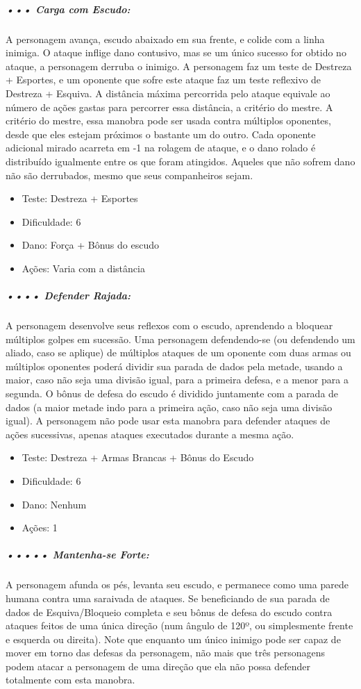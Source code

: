 \subparagraph{\bf ••• Carga com Escudo:}
A personagem avança, escudo abaixado em sua frente, e colide com a linha inimiga. O ataque inflige dano contusivo, mas se um único sucesso for obtido no ataque, a personagem derruba o inimigo. A personagem faz um teste de Destreza + Esportes, e um oponente que sofre este ataque faz um teste reflexivo de Destreza + Esquiva. A distância máxima percorrida pelo ataque equivale ao número de ações gastas para percorrer essa distância, a critério do mestre. A critério do mestre, essa manobra pode ser usada contra múltiplos oponentes, desde que eles estejam próximos o bastante um do outro. Cada oponente adicional mirado acarreta em -1 na rolagem de ataque, e o dano rolado é distribuído igualmente entre os que foram atingidos. Aqueles que não sofrem dano não são derrubados, mesmo que seus companheiros sejam.
\begin{itemize}[noitemsep]
\item Teste: Destreza + Esportes
\item Dificuldade: 6
\item Dano: Força + Bônus do escudo
\item Ações: Varia com a distância
\end{itemize}

\subparagraph{\bf •••• Defender Rajada:}
A personagem desenvolve seus reflexos com o escudo, aprendendo a bloquear múltiplos golpes em sucessão. Uma personagem defendendo-se (ou defendendo um aliado, caso se aplique) de múltiplos ataques de um oponente com duas armas ou múltiplos oponentes poderá dividir sua parada de dados pela metade, usando a maior, caso não seja uma divisão igual, para a primeira defesa, e a menor para a segunda. O bônus de defesa do escudo é dividido juntamente com a parada de dados (a maior metade indo para a primeira ação, caso não seja uma divisão igual). A personagem não pode usar esta manobra para defender ataques de ações sucessivas, apenas ataques executados durante a mesma ação.
\begin{itemize}[noitemsep]
\item Teste: Destreza + Armas Brancas + Bônus do Escudo
\item Dificuldade: 6
\item Dano: Nenhum
\item Ações: 1
\end{itemize}

\subparagraph{\bf ••••• Mantenha-se Forte:}
A personagem afunda os pés, levanta seu escudo, e permanece como uma parede humana contra uma saraivada de ataques. Se beneficiando de sua parada de dados de Esquiva/Bloqueio completa e seu bônus de defesa do escudo contra ataques feitos de uma única direção (num ângulo de 120º, ou simplesmente frente e esquerda ou direita). Note que enquanto um único inimigo pode ser capaz de mover em torno das defesas da personagem, não mais que três personagens podem atacar a personagem de uma direção que ela não possa defender totalmente com esta manobra.

